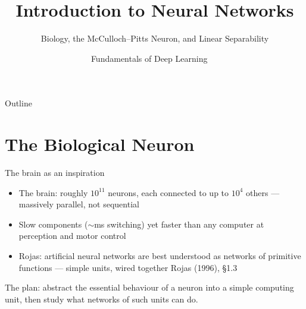 \documentclass[aspectratio=169, 11pt]{beamer}
\title{Introduction to Neural Networks}
\subtitle{Biology, the McCulloch--Pitts Neuron, and Linear Separability}
\author{Fundamentals of Deep Learning \ \textperiodcentered\ }
\institute{}
\date{}
\begin{document}
\maketitle

\begin{frame}{Outline}
  \tableofcontents
\end{frame}

\section{The Biological Neuron}

\begin{frame}{The brain as an inspiration}
  \begin{itemize}
    \item The brain: roughly $10^{11}$ neurons, each connected
          to up to $10^{4}$ others --- massively
          \alert{parallel}, not sequential
    \item Slow components ($\sim$ms switching) yet faster than
          any computer at perception and motor control
    \item Rojas: artificial neural networks are best understood
          as \alert{networks of primitive functions} ---
          simple units, wired together
          \hfill{\scriptsize Rojas (1996), \S1.3}
  \end{itemize}
  \vspace{0.4em}
  \begin{redhighlight}
    The plan: abstract the essential behaviour of a neuron
    into a simple computing unit, then study what networks of
    such units can do.
  \end{redhighlight}
\end{frame}
\end{document}
